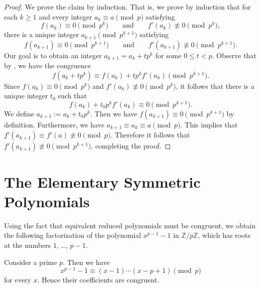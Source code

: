 \begin{proof}
  We prove the claim by induction. That is, we prove by induction that for each $k\geq 1$ and every integer $a_k\equiv a\pmod{p}$ satisfying
  \begin{equation*}
    f(a_k)\equiv 0\pmod{p^k} \qquad\text{and}\qquad f'(a_k)\nequiv 0\pmod{p^k},
  \end{equation*}
  there is a unique integer $a_{k+1}\pmod{p^{k+1}}$ satisfying
  \begin{equation*}
    f(a_{k+1})\equiv 0\pmod{p^{k+1}}\qquad\text{and}\qquad f'(a_{k+1})\nequiv 0\pmod{p^{k+1}}.
  \end{equation*}
  Our goal is to obtain an integer $a_{k+1}=a_k+tp^k$ for some $0\leq t<p$. Observe that by , we have the congruence
  \begin{equation*}
    f(a_k+tp^k)\equiv f(a_k)+ tp^k f'(a_k) \pmod{p^{k+1}}.
  \end{equation*}
  Since $f(a_k)\equiv 0\pmod{p^k}$ and $f'(a_k)\nequiv 0\pmod{p^k}$, it follows that there is a unique integer $t_0$ such that
  \begin{equation*}
    f(a_k)+ t_0p^k f'(a_k) \equiv 0 \pmod{p^{k+1}}.
  \end{equation*}
  We define $a_{k+1}:=a_k+t_0p^k$. Then we have $f(a_{k+1})\equiv 0\pmod{p^{k+1}}$ by definition. Furthermore, we have $a_{k+1}\equiv a_k\equiv a\pmod{p}$. This implies that $f'(a_{k+1})\equiv f'(a)\nequiv 0\pmod{p}$. Therefore it follows that $f'(a_{k+1})\nequiv 0\pmod{p^{k+1}}$, completing the proof.
\end{proof}

\section{The Elementary Symmetric Polynomials}

Using the fact that equivalent reduced polynomials must be congruent, we obtain the following factorization of the polynomial $x^{p-1}-1$ in $\mathbb{Z}/p\mathbb{Z}$, which has roots at the numbers $1$, \ldots, $p-1$.

\begin{theorem}\label{theorem:factorization-fermats-polynomial}
  Consider a prime $p$. Then we have
  \begin{equation*}
    x^{p-1}-1 \equiv (x-1)\cdots (x-p+1)\pmod{p}
  \end{equation*}
  for every $x$. Hence their coefficients are congruent.
\end{theorem}


